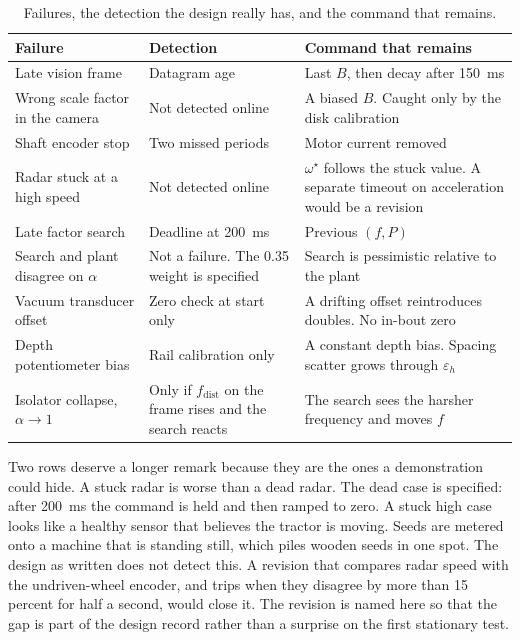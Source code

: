\begin{table}[htbp]
\centering
\caption{Failures, the detection the design really has, and the command that remains.}
\label{tab:fmea}
\begin{tabular}{@{}p{32mm}p{38mm}p{62mm}@{}}
\toprule
Failure & Detection & Command that remains \\
\midrule
Late vision frame & Datagram age & Last $B$, then decay after 150~ms \\
Wrong scale factor in the camera & Not detected online & A biased $B$. Caught only by the disk calibration \\
Shaft encoder stop & Two missed periods & Motor current removed \\
Radar stuck at a high speed & Not detected online & $\omega^{\star}$ follows the stuck value. A separate timeout on acceleration would be a revision \\
Late factor search & Deadline at 200~ms & Previous $(f,P)$ \\
Search and plant disagree on $\alpha$ & Not a failure. The 0.35 weight is specified & Search is pessimistic relative to the plant \\
Vacuum transducer offset & Zero check at start only & A drifting offset reintroduces doubles. No in-bout zero \\
Depth potentiometer bias & Rail calibration only & A constant depth bias. Spacing scatter grows through $\varepsilon_h$ \\
Isolator collapse, $\alpha\to 1$ & Only if $f_{\mathrm{dist}}$ on the frame rises and the search reacts & The search sees the harsher frequency and moves $f$ \\
\bottomrule
\end{tabular}
\end{table}

Two rows deserve a longer remark because they are the ones a demonstration could hide. A stuck radar is worse than a dead radar. The dead case is specified: after 200~ms the command is held and then ramped to zero. A stuck high case looks like a healthy sensor that believes the tractor is moving. Seeds are metered onto a machine that is standing still, which piles wooden seeds in one spot. The design as written does not detect this. A revision that compares radar speed with the undriven-wheel encoder, and trips when they disagree by more than 15 percent for half a second, would close it. The revision is named here so that the gap is part of the design record rather than a surprise on the first stationary test.

